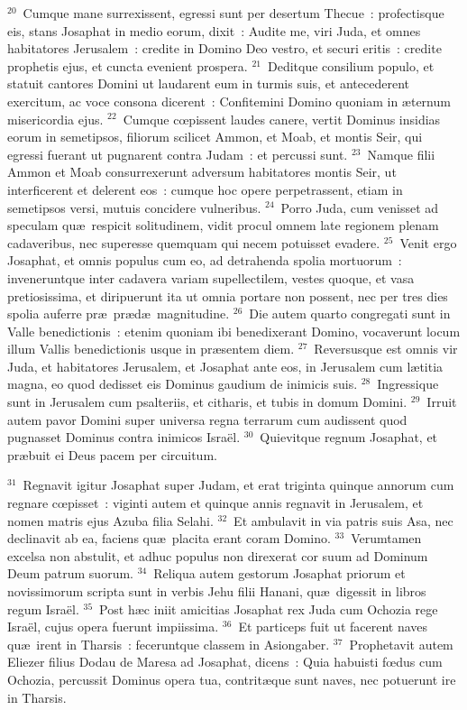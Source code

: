 ${}^{20}$~Cumque mane surrexissent, egressi sunt per desertum Thecue~: profectisque eis, stans Josaphat in medio eorum, dixit~: Audite me, viri Juda, et omnes habitatores Jerusalem~: credite in Domino Deo vestro, et securi eritis~: credite prophetis ejus, et cuncta evenient prospera.
${}^{21}$~Deditque consilium populo, et statuit cantores Domini ut laudarent eum in turmis suis, et antecederent exercitum, ac voce consona dicerent~: Confitemini Domino quoniam in \ae ternum misericordia ejus.
${}^{22}$~Cumque cœpissent laudes canere, vertit Dominus insidias eorum in semetipsos, filiorum scilicet Ammon, et Moab, et montis Seir, qui egressi fuerant ut pugnarent contra Judam~: et percussi sunt.
${}^{23}$~Namque filii Ammon et Moab consurrexerunt adversum habitatores montis Seir, ut interficerent et delerent eos~: cumque hoc opere perpetrassent, etiam in semetipsos versi, mutuis concidere vulneribus.
${}^{24}$~Porro Juda, cum venisset ad speculam qu\ae\ respicit solitudinem, vidit procul omnem late regionem plenam cadaveribus, nec superesse quemquam qui necem potuisset evadere.
${}^{25}$~Venit ergo Josaphat, et omnis populus cum eo, ad detrahenda spolia mortuorum~: inveneruntque inter cadavera variam supellectilem, vestes quoque, et vasa pretiosissima, et diripuerunt ita ut omnia portare non possent, nec per tres dies spolia auferre pr\ae\ pr\ae d\ae\ magnitudine.
${}^{26}$~Die autem quarto congregati sunt in Valle benedictionis~: etenim quoniam ibi benedixerant Domino, vocaverunt locum illum Vallis benedictionis usque in pr\ae sentem diem.
${}^{27}$~Reversusque est omnis vir Juda, et habitatores Jerusalem, et Josaphat ante eos, in Jerusalem cum l\ae titia magna, eo quod dedisset eis Dominus gaudium de inimicis suis.
${}^{28}$~Ingressique sunt in Jerusalem cum psalteriis, et citharis, et tubis in domum Domini.
${}^{29}$~Irruit autem pavor Domini super universa regna terrarum cum audissent quod pugnasset Dominus contra inimicos Isra\"el.
${}^{30}$~Quievitque regnum Josaphat, et pr\ae buit ei Deus pacem per circuitum.


${}^{31}$~Regnavit igitur Josaphat super Judam, et erat triginta quinque annorum cum regnare cœpisset~: viginti autem et quinque annis regnavit in Jerusalem, et nomen matris ejus Azuba filia Selahi.
${}^{32}$~Et ambulavit in via patris suis Asa, nec declinavit ab ea, faciens qu\ae\ placita erant coram Domino.
${}^{33}$~Verumtamen excelsa non abstulit, et adhuc populus non direxerat cor suum ad Dominum Deum patrum suorum.
${}^{34}$~Reliqua autem gestorum Josaphat priorum et novissimorum scripta sunt in verbis Jehu filii Hanani, qu\ae\ digessit in libros regum Isra\"el.
${}^{35}$~Post h\ae c iniit amicitias Josaphat rex Juda cum Ochozia rege Isra\"el, cujus opera fuerunt impiissima.
${}^{36}$~Et particeps fuit ut facerent naves qu\ae\ irent in Tharsis~: feceruntque classem in Asiongaber.
${}^{37}$~Prophetavit autem Eliezer filius Dodau de Maresa ad Josaphat, dicens~: Quia habuisti fœdus cum Ochozia, percussit Dominus opera tua, contrit\ae que sunt naves, nec potuerunt ire in Tharsis.

